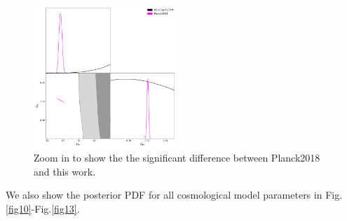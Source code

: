 \documentclass{cosmo}
\begin{document}
    \begin{figure}[h]
        \centering
        \includegraphics[width=0.48\textwidth]{H0LiCOW-Planck-allN-zoom.png}
        \caption{Zoom in to show the the significant difference
        between Planck2018 and this work.}
        \label{fig9}
    \end{figure}
    
    We also show the posterior PDF for all cosmological model parameters in Fig.\ref{fig10}-Fig.\ref{fig13}.
    
\end{document}
